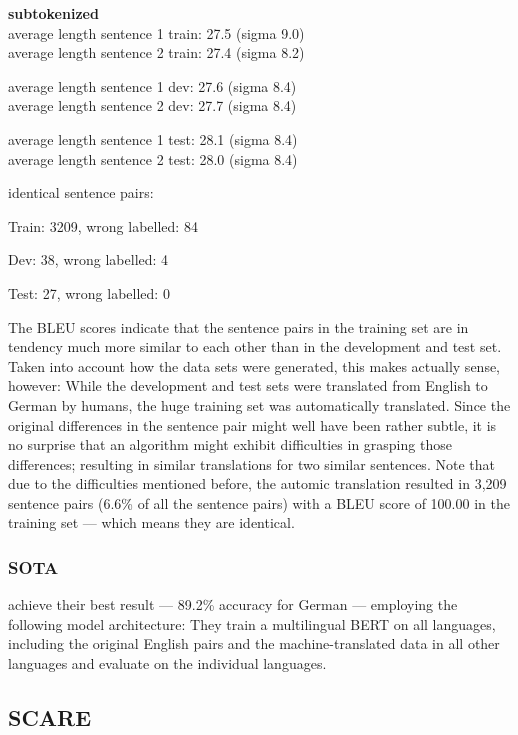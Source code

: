 \textbf{subtokenized} \\
average length sentence 1 train: 27.5 (sigma 9.0) \\
average length sentence 2 train: 27.4 (sigma 8.2)

average length sentence 1 dev: 27.6 (sigma 8.4) \\
average length sentence 2 dev: 27.7 (sigma 8.4)

average length sentence 1 test: 28.1 (sigma 8.4) \\
average length sentence 2 test: 28.0 (sigma 8.4)


identical sentence pairs:

Train: 3209, wrong labelled: 84

Dev: 38, wrong labelled: 4

Test: 27, wrong labelled: 0


The BLEU scores indicate that the sentence pairs in the training set are in tendency much
more similar to each other than in the development and test set. Taken into account how
the data sets were generated, this makes actually sense, however: While the development
and test sets were translated from English to German by humans, the huge training set was
automatically translated. Since the original differences in the sentence pair might well
have been rather subtle, it is no surprise that an algorithm might exhibit difficulties in
grasping those differences; resulting in similar translations for two similar sentences.
Note that due to the difficulties mentioned before, the automic translation resulted in
3,209 sentence pairs (6.6\% of all the sentence pairs) with a BLEU score of 100.00 in the
training set --- which means they are identical.


\subsubsection{SOTA}

\cite{yang2019paws} achieve their best result --- 89.2\% accuracy for German --- employing the
following model architecture:
They train a multilingual BERT on all languages, including the original English pairs and the
machine-translated data in all other languages and evaluate on the individual languages.

\subsection{SCARE}

